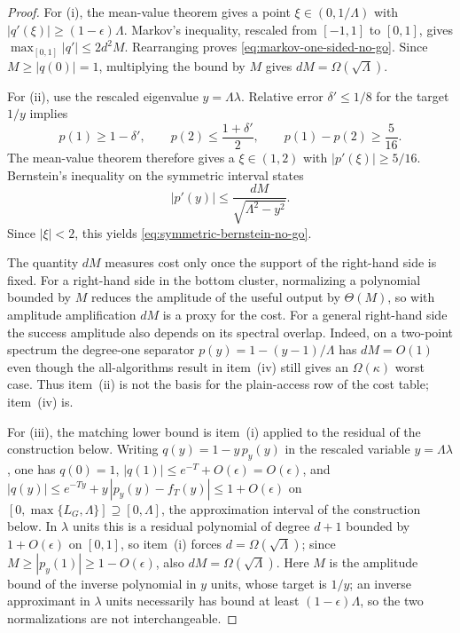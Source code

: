 \begin{proof}
For (i), the mean-value theorem gives a point
$\xi\in(0,1/\Lambda)$ with
$|q'(\xi)|\geq(1-\epsilon)\Lambda$.  Markov's inequality, rescaled from
$[-1,1]$ to $[0,1]$, gives
$\max_{[0,1]}|q'|\leq2d^2M$.  Rearranging proves
\eqref{eq:markov-one-sided-no-go}.  Since $M\geq|q(0)|=1$, multiplying the
bound by $M$ gives $dM=\Omega(\sqrt\Lambda)$.

For (ii), use the rescaled eigenvalue $y=\Lambda\lambda$.  Relative error
$\delta'\leq1/8$ for the target $1/y$ implies
\[
 p(1)\geq1-\delta',
 \qquad
 p(2)\leq\frac{1+\delta'}2,
 \qquad
 p(1)-p(2)\geq\frac5{16}.
\]
The mean-value theorem therefore gives a $\xi\in(1,2)$ with
$|p'(\xi)|\geq5/16$.  Bernstein's inequality on the symmetric interval
states
\[
 |p'(y)|\leq\frac{dM}{\sqrt{\Lambda^2-y^2}}.
\]
Since $|\xi|<2$, this yields
\eqref{eq:symmetric-bernstein-no-go}.

The quantity $dM$ measures cost only once the support of the right-hand
side is fixed.  For a right-hand side in the bottom cluster, normalizing a
polynomial bounded by $M$ reduces the amplitude of the useful output by
$\Theta(M)$, so with amplitude amplification $dM$ is a proxy for the cost.  For a general
right-hand side the success amplitude also depends on its spectral overlap.
Indeed, on a two-point spectrum the degree-one separator
$p(y)=1-(y-1)/\Lambda$ has $dM=O(1)$ even though the all-algorithms result in
item~\textup{(iv)} still gives an $\Omega(\kappa)$ worst case.  Thus
item~\textup{(ii)} is not the basis for the plain-access row of the cost
table; item~\textup{(iv)} is.

For (iii), the matching lower bound is item~\textup{(i)} applied to the
residual of the construction below.  Writing $q(y)=1-y\,p_y(y)$ in the
rescaled variable $y=\Lambda\lambda$, one has $q(0)=1$,
$|q(1)|\le e^{-T}+O(\epsilon)=O(\epsilon)$, and
$|q(y)|\le e^{-Ty}+y\,|p_y(y)-f_T(y)|\le1+O(\epsilon)$ on
$[0,\max\{L_G,\Lambda\}]\supseteq[0,\Lambda]$, the approximation interval of
the construction below.  In $\lambda$ units this is a residual
polynomial of degree $d+1$ bounded by $1+O(\epsilon)$ on $[0,1]$, so
item~\textup{(i)} forces $d=\Omega(\sqrt\Lambda)$; since
$M\ge|p_y(1)|\ge1-O(\epsilon)$, also $dM=\Omega(\sqrt\Lambda)$.  Here $M$ is
the amplitude bound of the inverse polynomial in $y$ units, whose target is
$1/y$; an inverse approximant in $\lambda$ units necessarily has bound at
least $(1-\epsilon)\Lambda$, so the two normalizations are not
interchangeable.


\end{proof}

